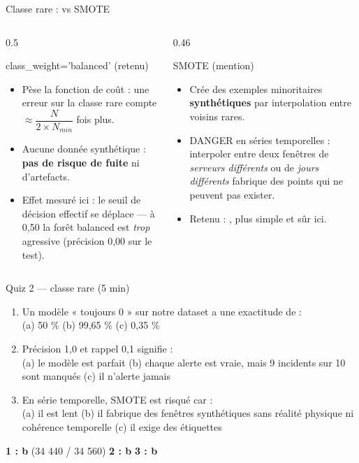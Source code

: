 \begin{frame}{Classe rare :  vs SMOTE}
\begin{columns}[t]
\begin{column}{0.5\textwidth}
\begin{block}{class\_weight='balanced' (retenu)}
\begin{itemize}
\item Pèse la fonction de coût : une erreur sur la classe rare
compte $\approx \dfrac{N}{2 \times N_{min}}$ fois plus.
\item Aucune donnée synthétique : \textbf{pas de risque de fuite}
ni d'artefacts.
\item Effet mesuré ici : le seuil de décision effectif se déplace
--- à 0,50 la forêt balanced est \emph{trop} agressive
(précision 0,00 sur le test).
\end{itemize}
\end{block}
\end{column}
\begin{column}{0.46\textwidth}
\begin{block}{SMOTE (mention)}
\begin{itemize}
\item Crée des exemples minoritaires \textbf{synthétiques} par
interpolation entre voisins rares.
\item DANGER en séries temporelles : interpoler entre deux
fenêtres de \emph{serveurs différents} ou de \emph{jours différents}
fabrique des points qui ne peuvent pas exister.
\item Retenu : , plus simple et sûr ici.
\end{itemize}
\end{block}
\end{column}
\end{columns}
\end{frame}

\begin{frame}{Quiz 2 --- classe rare (5 min)}
\begin{qbox}[3 questions]
\begin{enumerate}
\item Un modèle « toujours 0 » sur notre dataset a une exactitude de :\\
(a) 50 \% \quad (b) 99,65 \% \quad (c) 0,35 \%
\item Précision 1,0 et rappel 0,1 signifie :\\
(a) le modèle est parfait \quad (b) chaque alerte est vraie, mais
9 incidents sur 10 sont manqués \quad (c) il n'alerte jamais
\item En série temporelle, SMOTE est risqué car :\\
(a) il est lent \quad (b) il fabrique des fenêtres synthétiques
sans réalité physique ni cohérence temporelle \quad (c) il exige
des étiquettes
\end{enumerate}
\end{qbox}
\vspace{1mm}
\begin{solbox}[Réponses]
\textbf{1 : b} (34 440 / 34 560) \quad \textbf{2 : b} \quad \textbf{3 : b}
\end{solbox}
\end{frame}

